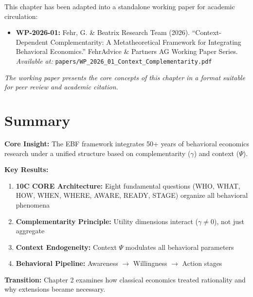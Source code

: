 \begin{tcolorbox}[colback=purple!5!white, colframe=purple!75!black,
    title=\textbf{Related Publications}]
\small

This chapter has been adapted into a standalone working paper for academic circulation:

\begin{itemize}[nosep]
    \item \textbf{WP-2026-01:} Fehr, G. \& Beatrix Research Team (2026). ``Context-Dependent Complementarity: A Metatheoretical Framework for Integrating Behavioral Economics.'' FehrAdvice \& Partners AG Working Paper Series. \\
    \textit{Available at:} \texttt{papers/WP\_2026\_01\_Context\_Complementarity.pdf}
\end{itemize}

\textit{The working paper presents the core concepts of this chapter in a format suitable for peer review and academic citation.}
\end{tcolorbox}

\section{Summary}
\label{sec:ch1-summary}

\begin{tcolorbox}[
    colback=blue!5!white,
    colframe=blue!75!black,
    title={\textbf{Chapter 1 Summary: Introduction to the EBF Framework}}
]

\textbf{Core Insight:} The EBF framework integrates 50+ years of behavioral economics research under a unified structure based on complementarity ($\gamma$) and context ($\Psi$).

\textbf{Key Results:}
\begin{enumerate}[nosep]
    \item \textbf{10C CORE Architecture:} Eight fundamental questions (WHO, WHAT, HOW, WHEN, WHERE, AWARE, READY, STAGE) organize all behavioral phenomena
    \item \textbf{Complementarity Principle:} Utility dimensions interact ($\gamma \neq 0$), not just aggregate
    \item \textbf{Context Endogeneity:} Context $\Psi$ modulates all behavioral parameters
    \item \textbf{Behavioral Pipeline:} Awareness $\rightarrow$ Willingness $\rightarrow$ Action stages
\end{enumerate}

\textbf{Transition:} Chapter 2 examines how classical economics treated rationality and why extensions became necessary.
\end{tcolorbox}

